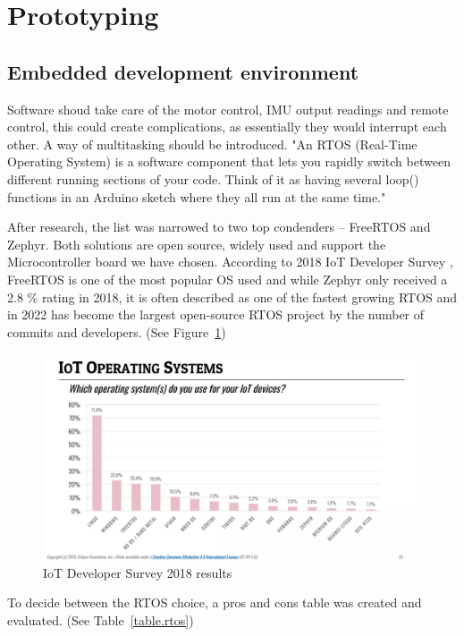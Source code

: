 \documentclass[titlepage,a4paper,11pt]{article}
\begin{document}
\section{Prototyping}
\subsection{Embedded development environment}

Software shoud take care of the motor control, IMU output readings and remote control, this could create complications, as essentially they would interrupt each other. A way of multitasking should be introduced.
"An RTOS (Real-Time Operating System) is a software component that lets you rapidly switch between different running sections of your code. Think of it as having several loop() functions in an Arduino sketch where they all run at the same time." \cite{Joe2019}

After research, the list was narrowed to two top condenders – FreeRTOS and Zephyr. Both solutions are open source, widely used and support the Microcontroller board we have chosen. \cite{Lemberg}
According to 2018 IoT Developer Survey \cite{IOT}, FreeRTOS is one of the most popular OS used and while Zephyr only received a 2.8 \% rating in 2018, it is often described as one of the fastest growing RTOS and in 2022 has become the largest open-source RTOS project by the number of commits and developers. (See Figure~\ref{fig:iot_os})
\begin{figure}[H]
    \centering
    \includegraphics[scale = 0.5]{iot_os.PNG}
    \caption{IoT Developer Survey 2018 results}
    \label{fig:iot_os}
\end{figure}

To decide between the RTOS choice, a pros and cons table was created and evaluated. \cite{Comparison} (See Table~\ref{table.rtos})
\end{document}

